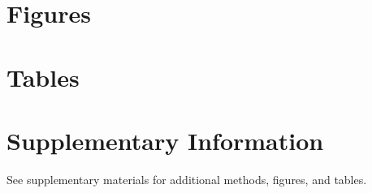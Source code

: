 \documentclass[9pt,twocolumn]{article}
\begin{document}



\clearpage
\section*{Figures}


\clearpage
\section*{Tables}


\clearpage
\section*{Supplementary Information}
See supplementary materials for additional methods, figures, and tables.
\end{document}
